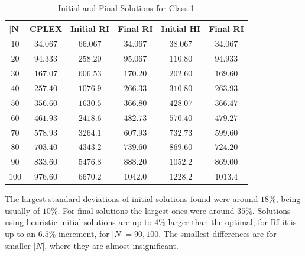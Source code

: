 \documentclass[a4paper,12pt]{article}
\begin{document}
	\begin{table}[H]
		\centering
		\begin{tabular}{c|c|c|c|c|c}
			$\mathbf{|N|}$	& \textbf{CPLEX}& \textbf{Initial RI}   & \textbf{Final RI}	& \textbf{Initial HI} 	& \textbf{Final RI} \\ \hline
			$ 10  $			& $ 34.067 $ 	& $ 66.067 $ 			& $ 34.067 $  		& $ 38.067 $ 			& $ 34.067 $		\\ \hline
			$ 20  $			& $ 94.333 $ 	& $ 258.20 $ 			& $ 95.067 $  		& $ 110.80 $ 			& $ 94.933 $		\\ \hline
			$ 30  $			& $ 167.07 $ 	& $ 606.53 $ 			& $ 170.20 $  		& $ 202.60 $ 			& $ 169.60 $ 		\\ \hline
			$ 40  $			& $ 257.40 $ 	& $ 1076.9 $ 			& $ 266.33$  		& $ 310.80 $ 			& $ 263.93 $ 		\\ \hline
			$ 50  $			& $ 356.60 $ 	& $ 1630.5 $ 			& $ 366.80$  		& $ 428.07 $ 			& $ 366.47 $ 		\\ \hline
			$ 60  $			& $ 461.93 $ 	& $ 2418.6 $ 			& $ 482.73 $  		& $ 570.40 $ 			& $ 479.27 $ 		\\ \hline
			$ 70 $			& $ 578.93 $ 	& $ 3264.1 $ 			& $ 607.93 $ 	 	& $ 732.73 $	 		& $ 599.60 $ 		\\ \hline
			$ 80 $			& $ 703.40 $ 	& $ 4343.2 $ 			& $ 739.60$  		& $ 869.60 $ 			& $ 724.20 $ 		\\ \hline
			$ 90 $			& $ 833.60 $ 	& $ 5476.8 $ 			& $ 888.20$  		& $ 1052.2 $ 			& $ 869.00 $ 			\\ \hline
			$ 100 $			& $ 976.60 $ 	& $ 6670.2 $ 			& $ 1042.0 $  		& $ 1228.2 $ 			& $ 1013.4 $ 		\\
		\end{tabular}
		\caption{Initial and Final Solutions for Class 1}
		\label{table:sols}
	\end{table}

	The largest standard deviations of initial solutions found were around $18\%$, being usually of $10\%$.
	For final solutions the largest ones were around $35\%$.
	Solutions using heuristic initial solutions are up to $4\%$ larger than the optimal, for RI it is up to an $6.5\%$ increment, for $|N| = 90,100$.
	The smallest differences are for smaller $ |N| $, where they are almost insignificant.
	
\end{document}
